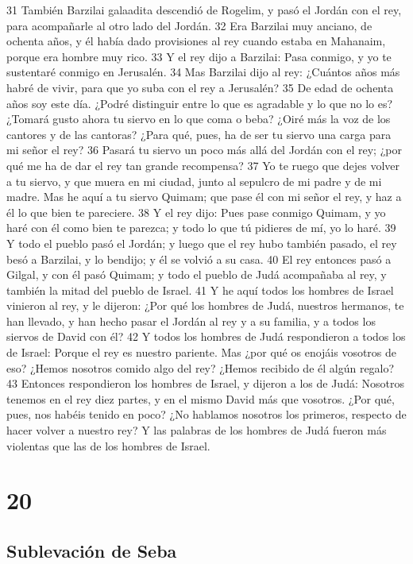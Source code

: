 31 También Barzilai galaadita descendió de Rogelim, y pasó el Jordán con el rey, para acompañarle al otro lado del Jordán.
32 Era Barzilai muy anciano, de ochenta años, y él había dado provisiones al rey cuando estaba en Mahanaim, porque era hombre muy rico.
33 Y el rey dijo a Barzilai: Pasa conmigo, y yo te sustentaré conmigo en Jerusalén.
34 Mas Barzilai dijo al rey: ¿Cuántos años más habré de vivir, para que yo suba con el rey a Jerusalén?
35 De edad de ochenta años soy este día. ¿Podré distinguir entre lo que es agradable y lo que no lo es? ¿Tomará gusto ahora tu siervo en lo que coma o beba? ¿Oiré más la voz de los cantores y de las cantoras? ¿Para qué, pues, ha de ser tu siervo una carga para mi señor el rey?
36 Pasará tu siervo un poco más allá del Jordán con el rey; ¿por qué me ha de dar el rey tan grande recompensa?
37 Yo te ruego que dejes volver a tu siervo, y que muera en mi ciudad, junto al sepulcro de mi padre y de mi madre. Mas he aquí a tu siervo Quimam; que pase él con mi señor el rey, y haz a él lo que bien te pareciere.
38 Y el rey dijo: Pues pase conmigo Quimam, y yo haré con él como bien te parezca; y todo lo que tú pidieres de mí, yo lo haré.
39 Y todo el pueblo pasó el Jordán; y luego que el rey hubo también pasado, el rey besó a Barzilai, y lo bendijo; y él se volvió a su casa.
40 El rey entonces pasó a Gilgal, y con él pasó Quimam; y todo el pueblo de Judá acompañaba al rey, y también la mitad del pueblo de Israel.
41 Y he aquí todos los hombres de Israel vinieron al rey, y le dijeron: ¿Por qué los hombres de Judá, nuestros hermanos, te han llevado, y han hecho pasar el Jordán al rey y a su familia, y a todos los siervos de David con él?
42 Y todos los hombres de Judá respondieron a todos los de Israel: Porque el rey es nuestro pariente. Mas ¿por qué os enojáis vosotros de eso? ¿Hemos nosotros comido algo del rey? ¿Hemos recibido de él algún regalo?
43 Entonces respondieron los hombres de Israel, y dijeron a los de Judá: Nosotros tenemos en el rey diez partes, y en el mismo David más que vosotros. ¿Por qué, pues, nos habéis tenido en poco? ¿No hablamos nosotros los primeros, respecto de hacer volver a nuestro rey? Y las palabras de los hombres de Judá fueron más violentas que las de los hombres de Israel.

\chapter{20}

\section*{Sublevación de Seba}


